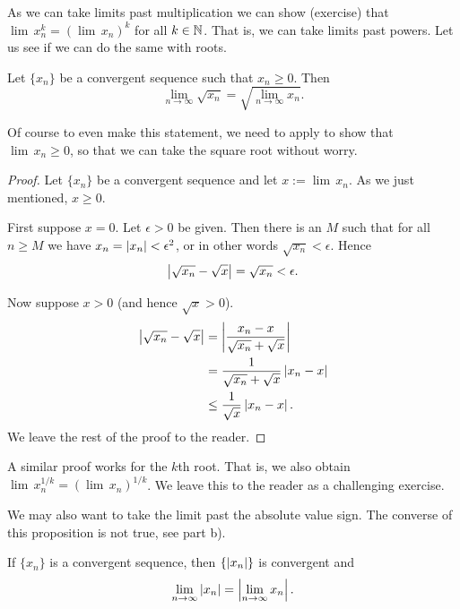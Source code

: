 As we can take limits past multiplication we can show (exercise)
that $\lim\, x_n^k = {(\lim\, x_n)}^k$ for all $k \in {\mathbb{N}}$.
That is, we can take limits
past powers.  Let us see if we can do the same with roots.

\begin{prop}
Let $\{ x_n \}$ be a convergent sequence such
that $x_n \geq 0$.
Then
\begin{equation*}
\lim_{n\to\infty} \sqrt{x_n} =
\sqrt{ \lim_{n\to\infty} x_n } .
\end{equation*}
\end{prop}

Of course to even make this statement, we need to apply
 to show
that
$\lim\, x_n \geq 0$, so that we can take the square root without
worry.

\begin{proof}
Let $\{ x_n \}$ be a convergent sequence and let $x := \lim\, x_n$.
As we just mentioned, $x \geq 0$.

First suppose $x=0$.  Let $\epsilon > 0$ be given.
Then there is an $M$ such that for all $n \geq M$ we have
$x_n = \left\lvert {x_n} \right\rvert < \epsilon^2$, or in other words $\sqrt{x_n} < \epsilon$.
Hence
\begin{equation*}
\left\lvert {\sqrt{x_n} - \sqrt{x}} \right\rvert =
\sqrt{x_n} < \epsilon.
\end{equation*}

Now suppose $x > 0$ (and hence $\sqrt{x} > 0$).
\begin{equation*}
\begin{split}
\left\lvert {\sqrt{x_n}-\sqrt{x}} \right\rvert &= 
\left\lvert {\frac{x_n-x}{\sqrt{x_n}+\sqrt{x}}} \right\rvert \\
&=
\frac{1}{\sqrt{x_n}+\sqrt{x}}
\left\lvert {x_n-x} \right\rvert \\
& \leq
\frac{1}{\sqrt{x}}
\left\lvert {x_n-x} \right\rvert .
\end{split}
\end{equation*}
We leave the rest of the proof to the reader.
\end{proof}

A similar proof works for the $k$th root.  That is, we also
obtain
$\lim\, x_n^{1/k} = {( \lim\, x_n )}^{1/k}$.  We leave this to the reader
as a challenging exercise.

We may also want to take the limit past the absolute value sign.
The converse of this proposition is not true, see
 part b).

\begin{prop}
If $\{ x_n \}$ is a convergent sequence, then $\{ \left\lvert {x_n} \right\rvert \}$
is convergent and
\begin{equation*}
\lim_{n\to\infty} \left\lvert {x_n} \right\rvert = 
\left\lvert {\lim_{n\to\infty} x_n} \right\rvert .
\end{equation*}
\end{prop}

